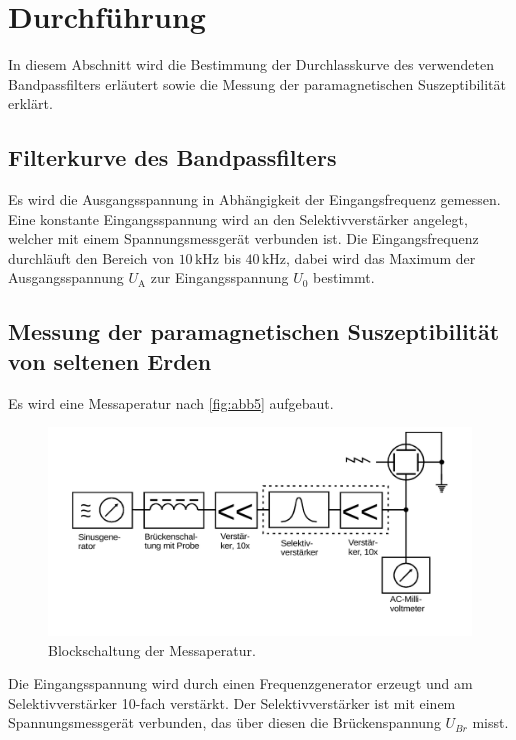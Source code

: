 \section{Durchführung}
\label{sec:Durchführung}

In diesem Abschnitt wird die Bestimmung der Durchlasskurve des verwendeten Bandpassfilters erläutert sowie die Messung der paramagnetischen Suszeptibilität erklärt.

\subsection{Filterkurve des Bandpassfilters}

Es wird die Ausgangsspannung in Abhängigkeit der Eingangsfrequenz gemessen. 
Eine konstante Eingangsspannung wird an den Selektivverstärker angelegt, welcher mit einem Spannungsmessgerät verbunden ist. 
Die Eingangsfrequenz durchläuft den Bereich von $ 10 \, \unit{\kilo\hertz}$ bis $40 \, \unit{\kilo\hertz}$, dabei wird das Maximum der Ausgangsspannung $ U_\text{A} $ zur Eingangsspannung $U_0$ bestimmt.


\subsection{Messung der paramagnetischen Suszeptibilität von seltenen Erden}

Es wird eine Messaperatur nach \autoref{fig:abb5} aufgebaut.

\begin{figure}[H]
    \centering
    \includegraphics{figures/Abb_5.pdf}
    \caption{Blockschaltung der Messaperatur\cite{ap07}.}
    \label{fig:abb5}
\end{figure} 

Die Eingangsspannung wird durch einen Frequenzgenerator erzeugt und am Selektivverstärker 10-fach verstärkt.
Der Selektivverstärker ist mit einem Spannungsmessgerät verbunden, das über diesen die Brückenspannung $ U_{Br}$ misst.\\

